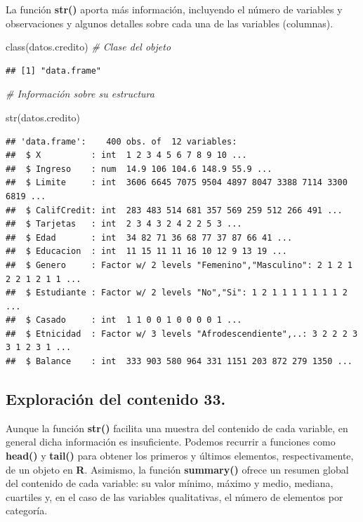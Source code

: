 \documentclass[
  12pt,
]{book}
\newenvironment{Shaded}{\begin{snugshade}}{\end{snugshade}}
\newcommand{\CommentTok}[1]{\textcolor[rgb]{0.56,0.35,0.01}{\textit{#1}}}
\newcommand{\FunctionTok}[1]{\textcolor[rgb]{0.00,0.00,0.00}{#1}}
\newcommand{\NormalTok}[1]{#1}
\begin{document}
La función \textbf{str()} aporta más información, incluyendo el número de variables y observaciones y algunos detalles
sobre cada una de las variables (columnas).

\begin{Shaded}
\begin{Highlighting}[]
\FunctionTok{class}\NormalTok{(datos.credito) }\CommentTok{\# Clase del objeto}
\end{Highlighting}
\end{Shaded}

\begin{verbatim}
## [1] "data.frame"
\end{verbatim}

\begin{Shaded}
\begin{Highlighting}[]
\CommentTok{\# Información sobre su estructura}

\FunctionTok{str}\NormalTok{(datos.credito)}
\end{Highlighting}
\end{Shaded}

\begin{verbatim}
## 'data.frame':    400 obs. of  12 variables:
##  $ X          : int  1 2 3 4 5 6 7 8 9 10 ...
##  $ Ingreso    : num  14.9 106 104.6 148.9 55.9 ...
##  $ Limite     : int  3606 6645 7075 9504 4897 8047 3388 7114 3300 6819 ...
##  $ CalifCredit: int  283 483 514 681 357 569 259 512 266 491 ...
##  $ Tarjetas   : int  2 3 4 3 2 4 2 2 5 3 ...
##  $ Edad       : int  34 82 71 36 68 77 37 87 66 41 ...
##  $ Educacion  : int  11 15 11 11 16 10 12 9 13 19 ...
##  $ Genero     : Factor w/ 2 levels "Femenino","Masculino": 2 1 2 1 2 2 1 2 1 1 ...
##  $ Estudiante : Factor w/ 2 levels "No","Si": 1 2 1 1 1 1 1 1 1 2 ...
##  $ Casado     : int  1 1 0 0 1 0 0 0 0 1 ...
##  $ Etnicidad  : Factor w/ 3 levels "Afrodescendiente",..: 3 2 2 2 3 3 1 2 3 1 ...
##  $ Balance    : int  333 903 580 964 331 1151 203 872 279 1350 ...
\end{verbatim}

\hypertarget{exploraciuxf3n-del-contenido-33.}{%
\subsection{\texorpdfstring{\textbf{Exploración del contenido 33}.}{Exploración del contenido 33.}}\label{exploraciuxf3n-del-contenido-33.}}

Aunque la función \textbf{str()} facilita una muestra del contenido de cada variable, en
general dicha información es insuficiente. Podemos recurrir a funciones
como \textbf{head()} y \textbf{tail()} para obtener los primeros y últimos elementos, respectivamente, de un objeto en \textbf{R}. Asimismo, la función \textbf{summary()} ofrece un resumen global del contenido de cada variable: su valor mínimo, máximo y medio, mediana, cuartiles
y, en el caso de las variables qualitativas, el número de elementos por categoría.
\end{document}
